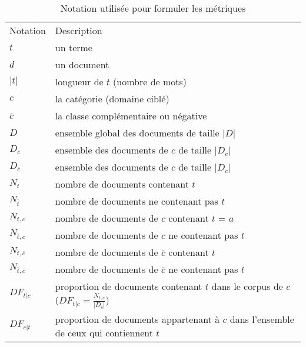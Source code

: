 \begin{table}[!htb]
	\centering
	\begin{tabular}{lp{}}
		\hline\noalign{\smallskip}
		Notation & Description \\
		\noalign{\smallskip}
		\hline
$t$ & un terme \\
$d$& un document \\
$\vert t \vert$ & longueur de $t$ (nombre de mots) \\
$c$ & la catégorie (domaine ciblé) \\
$\overline{c}$ & la classe complémentaire ou négative \\
$D$& ensemble global des documents de taille $\vert D \vert$ \\
$D_{c}$& ensemble des documents de $c$ de taille $\vert D_{c} \vert$ \\%
$D_{\overline{c}}$& ensemble des documents de $\overline{c}$ de taille $\vert D_{\overline{c}} \vert$\\%
$N_{t}$& nombre de documents contenant $t$\\
$N_{\overline{t}}$& nombre de documents ne contenant pas $t$\\
$N_{t,c}$ & nombre de documents de $c$ contenant $t$  = $a$\\
$N_{\overline{t},c}$ & nombre de documents de $c$ ne contenant pas $t$\\%
$N_{t,\overline{c}}$ & nombre de documents de $\overline{c}$ contenant $t$\\%
$N_{\overline{t},\overline{c}}$ & nombre de documents de $\overline{c}$ ne contenant pas $t$\\%
$DF_{t \vert c}$ & proportion de documents contenant $t$ dans le corpus de $c$ ($DF_{t \vert c} = \frac{N_{t,c}}{\vert D_c \vert}$) \\
$DF_{c \vert t}$ & proportion de documents appartenant à $c$ dans l'ensemble de ceux qui contiennent $t$  \\
\hline
\end{tabular}
\caption{Notation utilisée pour formuler les métriques} \label{quanta:tab:notations_metriques}
\end{table}

